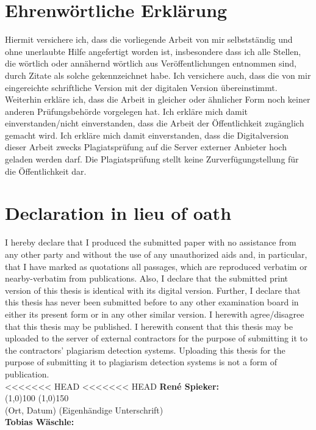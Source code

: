 \clearpage

\section*{Ehrenwörtliche Erklärung}
Hiermit versichere ich, dass die vorliegende Arbeit von mir selbstständig und 
ohne unerlaubte Hilfe angefertigt worden ist, insbesondere dass ich alle Stellen, die wörtlich oder annähernd wörtlich aus Veröffentlichungen entnommen sind, durch Zitate als solche gekennzeichnet habe. Ich versichere auch, dass die von mir eingereichte schriftliche Version mit der digitalen Version übereinstimmt. 
Weiterhin erkläre ich, dass die Arbeit in gleicher oder ähnlicher Form noch keiner anderen Prüfungsbehörde vorgelegen hat. Ich erkläre mich damit einverstanden/nicht einverstanden, dass die Arbeit der Öffentlichkeit zugänglich gemacht wird. Ich erkläre mich damit einverstanden, dass die Digitalversion dieser Arbeit zwecks Plagiatsprüfung auf die Server externer Anbieter hoch geladen werden darf. Die Plagiatsprüfung stellt keine Zurverfügungstellung für die Öffentlichkeit dar.\section*{Declaration in lieu of oath}
I hereby declare that I produced the submitted paper with no assistance from any other party and without the use of any unauthorized aids and, in particular, that I have marked as quotations all passages, which are reproduced verbatim or nearby-verbatim from publications. Also, I declare that the submitted print version of this thesis is identical with  its digital version. Further, I declare that this thesis has never been submitted before to any other examination board in either its present form or in any other similar version. I herewith agree/disagree that this thesis may be published. 
I herewith consent that this thesis may be uploaded to the server of external contractors for the purpose of submitting it to the contractors’ plagiarism detection systems. Uploading this thesis for the purpose of submitting it to plagiarism detection systems is not a form of publication.\\[0.5cm]
<<<<<<< HEAD
<<<<<<< HEAD
\textbf{René Spieker:}\\[1cm]
\line(1,0){100} \hfill \line(1,0){150}\\
(Ort, Datum) \hfill (Eigenhändige Unterschrift)\\[1cm]
\textbf{Tobias Wäschle:}\\[1cm]
